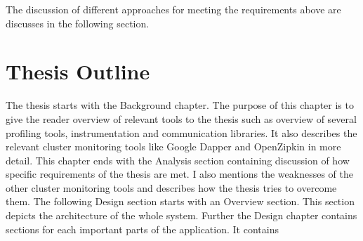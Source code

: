 The discussion of different approaches for meeting the requirements above are discusses in the following section.

\section{Thesis Outline}
The thesis starts with the Background chapter. The purpose of this chapter is to give the reader overview of relevant tools to the thesis  such as overview of several profiling tools, instrumentation and communication libraries. It also describes the relevant cluster monitoring tools like Google Dapper and OpenZipkin in more detail. This chapter ends with the Analysis section containing discussion of how specific requirements of the thesis are met. I also mentions the weaknesses of the other cluster monitoring tools and describes how the thesis tries to overcome them. The following Design section starts with an Overview section. This section depicts the architecture of the whole system. Further the Design chapter contains sections for each important parts of the application. It contains 

